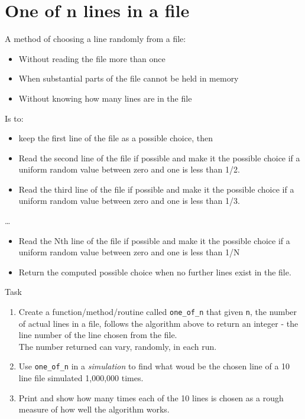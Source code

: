 \pagebreak{}
\section*{One of n lines in a file}

A method of choosing a line randomly from a file:

\begin{itemize}
\item
  Without reading the file more than once
\item
  When substantial parts of the file cannot be held in memory
\item
  Without knowing how many lines are in the file
\end{itemize}

Is to:

\begin{itemize}
\item
  keep the first line of the file as a possible choice, then
\item
  Read the second line of the file if possible and make it the possible
  choice if a uniform random value between zero and one is less than
  1/2.
\item
  Read the third line of the file if possible and make it the possible
  choice if a uniform random value between zero and one is less than
  1/3.
\end{itemize}

\ldots{}

\begin{itemize}
\item
  Read the Nth line of the file if possible and make it the possible
  choice if a uniform random value between zero and one is less than 1/N
\end{itemize}

\begin{itemize}
\item
  Return the computed possible choice when no further lines exist in the
  file.
\end{itemize}

\begin{description}
\item[Task]
\end{description}

\begin{enumerate}
\item
  Create a function/method/routine called \texttt{one\_of\_n} that given
  \texttt{n}, the number of actual lines in a file, follows the
  algorithm above to return an integer - the line number of the line
  chosen from the file. \\The number returned can vary, randomly, in
  each run.
\item
  Use \texttt{one\_of\_n} in a \emph{simulation} to find what woud be
  the chosen line of a 10 line file simulated 1,000,000 times.
\item
  Print and show how many times each of the 10 lines is chosen as a
  rough measure of how well the algorithm works.
\end{enumerate}

